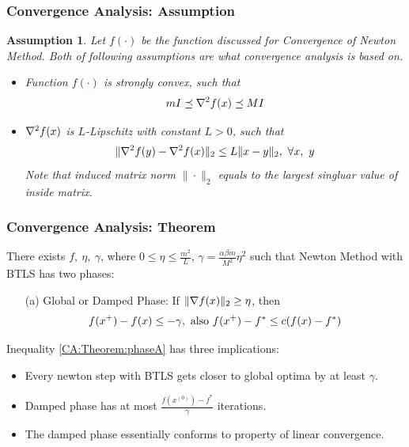 \documentclass{beamer}
\newcommand{\be}{\begin{eqnarray}}
\newcommand{\ee}{\end{eqnarray}}
\newtheorem{assumption}{Assumption}
\begin{document}
\begin{frame}
    \frametitle{Convergence Analysis: Assumption}    
    \begin{assumption}
        Let $f(\cdot)$ be the function discussed for Convergence of Newton
        Method. Both of following assumptions are what convergence analysis is
        based on.
        \begin{itemize}
            \item Function $f(\cdot)$ is strongly convex, such that
        \be
        m I \preceq \fhess \preceq M I
        \ee
    \item $\nabla^2 f(x)$ is $L$-Lipschitz with constant $L > 0$, such that
        \be
        \| \hessian{}{f}{y} - \hessian{}{f}{x} \|_2 \leq L \|x-y\|_2,\ 
        \forall x,\ y
        \ee
        Note that induced matrix norm $\| \cdot \|_2$ equals to the largest
        singluar value of inside matrix.
        \end{itemize}
    \end{assumption}
\end{frame}

\begin{frame}
    \frametitle{Convergence Analysis: Theorem}    
    \begin{theorem}[Part I]
        There exists $f,\ \eta,\ \gamma$, where $ 0 \leq \eta \leq \frac{m^2}{L}$,
        $\gamma = \frac{\alpha \beta m}{M^2}\eta^2$
        such that Newton Method with BTLS has two phases: 
        \begin{itemize}
            \item[(a)] Global or Damped Phase: If $\|\nabla f(x)\|_2 \geq \eta$, then 
                \be
                f(\xp) - f(x) \leq -\gamma, \text{ also } 
                f(\xp) - f^* \leq c(f(x)-f^*) \label{CA:Theorem:phaseA}
                \ee
        \end{itemize}
    \end{theorem}
        Inequality \eqref{CA:Theorem:phaseA} has three implications: 
        \begin{itemize}
            \item Every newton step with BTLS gets closer to global optima by
                at least $\gamma$.
            \item Damped phase has at most $\frac{f(x^{(0)}) -
                    f^{*}}{\gamma}$ iterations.
            \item The damped phase essentially conforms to property of linear convergence.
        \end{itemize}
\end{frame}
\end{document}
